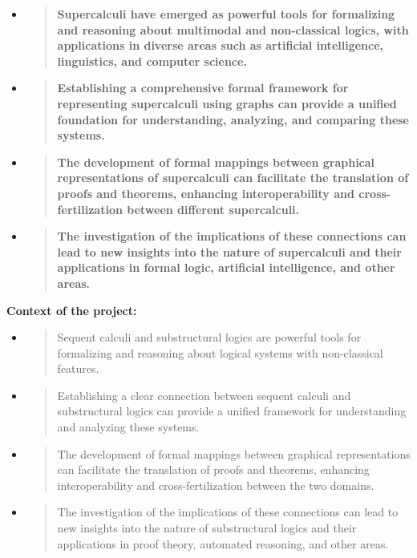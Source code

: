 \begin{itemize}
\item
  \begin{quote}
  \textbf{Supercalculi have emerged as powerful tools for formalizing
  and reasoning about multimodal and non-classical logics, with
  applications in diverse areas such as artificial intelligence,
  linguistics, and computer science.}
  \end{quote}
\item
  \begin{quote}
  \textbf{Establishing a comprehensive formal framework for representing
  supercalculi using graphs can provide a unified foundation for
  understanding, analyzing, and comparing these systems.}
  \end{quote}
\item
  \begin{quote}
  \textbf{The development of formal mappings between graphical
  representations of supercalculi can facilitate the translation of
  proofs and theorems, enhancing interoperability and
  cross-fertilization between different supercalculi.}
  \end{quote}
\item
  \begin{quote}
  \textbf{The investigation of the implications of these connections can
  lead to new insights into the nature of supercalculi and their
  applications in formal logic, artificial intelligence, and other
  areas.}
  \end{quote}
\end{itemize}

\textbf{Context of the project:}

\begin{itemize}
\item
  \begin{quote}
  Sequent calculi and substructural logics are powerful tools for
  formalizing and reasoning about logical systems with non-classical
  features.
  \end{quote}
\item
  \begin{quote}
  Establishing a clear connection between sequent calculi and
  substructural logics can provide a unified framework for understanding
  and analyzing these systems.
  \end{quote}
\item
  \begin{quote}
  The development of formal mappings between graphical representations
  can facilitate the translation of proofs and theorems, enhancing
  interoperability and cross-fertilization between the two domains.
  \end{quote}
\item
  \begin{quote}
  The investigation of the implications of these connections can lead to
  new insights into the nature of substructural logics and their
  applications in proof theory, automated reasoning, and other areas.
  \end{quote}
\end{itemize}


